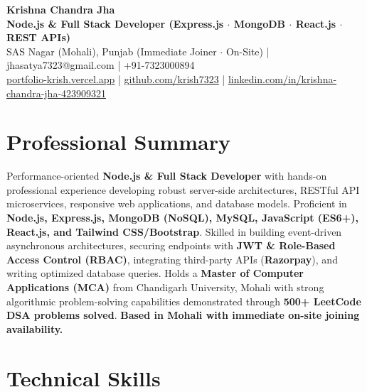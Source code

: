 \documentclass[a4paper,10pt]{article}
\begin{document}
\begin{center}

    {\LARGE \textbf{Krishna Chandra Jha}} \\[2.5pt]

    \textbf{Node.js \& Full Stack Developer (Express.js $\cdot$ MongoDB $\cdot$ React.js $\cdot$ REST APIs)} \\[3.5pt]

    SAS Nagar (Mohali), Punjab (Immediate Joiner $\cdot$ On-Site)
    \quad | \quad
    jhasatya7323@gmail.com
    \quad | \quad
    +91-7323000894
    \\[2.5pt]

    \href{https://portfolio-ashen-alpha-dv0whhsamo.vercel.app/}{portfolio-krish.vercel.app}
    \quad | \quad
    \href{https://github.com/krish7323}{github.com/krish7323}
    \quad | \quad
    \href{https://linkedin.com/in/krishna-chandra-jha-423909321}
    {linkedin.com/in/krishna-chandra-jha-423909321}

\end{center}

\section*{Professional Summary}

Performance-oriented \textbf{Node.js \& Full Stack Developer} with hands-on professional experience developing robust server-side architectures, RESTful API microservices, responsive web applications, and database models. Proficient in \textbf{Node.js, Express.js, MongoDB (NoSQL), MySQL, JavaScript (ES6+), React.js, and Tailwind CSS/Bootstrap}. Skilled in building event-driven asynchronous architectures, securing endpoints with \textbf{JWT \& Role-Based Access Control (RBAC)}, integrating third-party APIs (\textbf{Razorpay}), and writing optimized database queries. Holds a \textbf{Master of Computer Applications (MCA)} from Chandigarh University, Mohali with strong algorithmic problem-solving capabilities demonstrated through \textbf{500+ LeetCode DSA problems solved}. \textbf{Based in Mohali with immediate on-site joining availability.}

\section*{Technical Skills}
\end{document}
